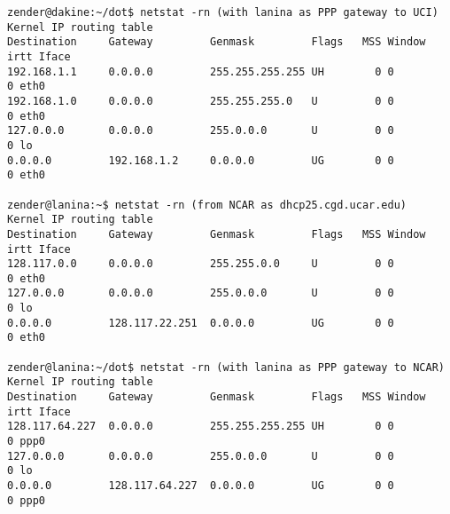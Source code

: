 \documentclass[12pt,twoside]{article}
\begin{document}
\begin{verbatim}
zender@dakine:~/dot$ netstat -rn (with lanina as PPP gateway to UCI)
Kernel IP routing table
Destination     Gateway         Genmask         Flags   MSS Window  irtt Iface
192.168.1.1     0.0.0.0         255.255.255.255 UH        0 0          0 eth0
192.168.1.0     0.0.0.0         255.255.255.0   U         0 0          0 eth0
127.0.0.0       0.0.0.0         255.0.0.0       U         0 0          0 lo
0.0.0.0         192.168.1.2     0.0.0.0         UG        0 0          0 eth0

zender@lanina:~$ netstat -rn (from NCAR as dhcp25.cgd.ucar.edu)
Kernel IP routing table
Destination     Gateway         Genmask         Flags   MSS Window  irtt Iface
128.117.0.0     0.0.0.0         255.255.0.0     U         0 0          0 eth0
127.0.0.0       0.0.0.0         255.0.0.0       U         0 0          0 lo
0.0.0.0         128.117.22.251  0.0.0.0         UG        0 0          0 eth0

zender@lanina:~/dot$ netstat -rn (with lanina as PPP gateway to NCAR)
Kernel IP routing table
Destination     Gateway         Genmask         Flags   MSS Window  irtt Iface
128.117.64.227  0.0.0.0         255.255.255.255 UH        0 0          0 ppp0
127.0.0.0       0.0.0.0         255.0.0.0       U         0 0          0 lo
0.0.0.0         128.117.64.227  0.0.0.0         UG        0 0          0 ppp0
\end{verbatim}
\end{document}
